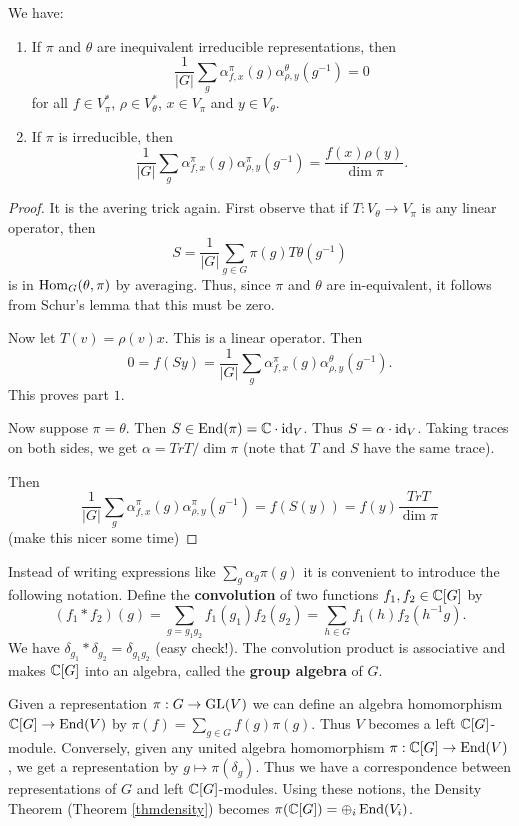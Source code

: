 \documentclass[11pt, english]{article}
\begin{document}
\begin{thm}
 We have:
 \begin{enumerate}
 \item If $\pi$ and $\theta$ are inequivalent irreducible representations, then
\[
\frac 1{\lvert G \rvert} \sum_g \alpha_{f,x}^\pi(g) \alpha_{\rho,y}^\theta(g^{-1}) = 0
\]
for all $f \in V_\pi^\ast$, $\rho \in V_\theta^\ast$, $x \in V_\pi$ and $y \in V_\theta$.
\item If $\pi$ is irreducible, then
\[
\frac{1}{\lvert G \rvert} \sum_g \alpha_{f,x}^\pi(g) \alpha_{\rho,y}^\pi (g^{-1}) = \frac{f(x) \rho(y)}{\dim \pi}.
\]
 \end{enumerate}
\end{thm}
\begin{proof}
It is the avering trick again. First observe that if $T:V_\theta \to V_\pi$ is any linear operator, then 
\[
S = \frac{1}{\lvert G \rvert} \sum_{g \in G} \pi(g) T \theta(g^{-1}) 
\]
is in $\operatorname{Hom}_G(\theta,\pi)$ by averaging. Thus, since $\pi$ and $\theta$ are in-equivalent, it follows from Schur's lemma that this must be zero.

Now let $T(v) = \rho(v)x$. This is a linear operator. Then
$$
0 = f(Sy) = \frac{1}{\lvert G \rvert} \sum_g \alpha_{f,x}^\pi (g) \alpha_{\rho,y}^\theta(g^{-1}).
$$
This proves part $1$.

Now suppose $\pi=\theta$. Then $S \in \operatorname{End}(\pi) = \mathbb{C} \cdot \text{id}_V$. Thus $S = \alpha \cdot \text{id}_V$. Taking traces on both sides, we get $\alpha = Tr T/\dim \pi$ (note that $T$ and $S$ have the same trace).

Then
$$
\frac 1{\lvert G \rvert} \sum_g \alpha_{f,x}^\pi(g) \alpha_{\rho,y}^\pi(g^{-1}) = f(S(y)) = f(y) \frac{Tr T}{\dim \pi}
$$
(make this nicer some time)
\end{proof}

Instead of writing expressions like $\sum_g \alpha_g \pi(g)$ it is convenient to introduce the following notation. Define the \textbf{convolution} of two functions $f_1,f_2 \in \mathbb{C}[G]$ by
$$
(f_1 \ast f_2)(g) = \sum_{g=g_1g_2} f_1(g_1)f_2(g_2) = \sum_{h \in G} f_1(h)f_2(h^{-1}g).
$$
We have $\delta_{g_1} \ast \delta_{g_2} = \delta_{g_1g_2}$ (easy check!). The convolution product is associative and makes $\mathbb{C}[G]$ into an algebra, called the \textbf{group algebra} of $G$. 

Given a representation $\pi:G \to \operatorname{GL}(V)$ we can define an algebra homomorphism $\mathbb{C}[G] \to \operatorname{End}(V)$ by $\pi(f) = \sum_{g \in G} f(g) \pi(g)$. Thus $V$ becomes a left $\mathbb{C}[G]$-module. Conversely, given any united algebra homomorphism $\pi:\mathbb{C}[G] \to \operatorname{End}(V)$, we get a representation by $g \mapsto \pi(\delta_g)$. Thus we have a correspondence between representations of $G$ and left $\mathbb{C}[G]$-modules. Using these notions, the Density Theorem (Theorem \ref{thmdensity}) becomes $\pi(\mathbb{C}[G]) = \oplus_i \operatorname{End}(V_i)$.
\end{document}
